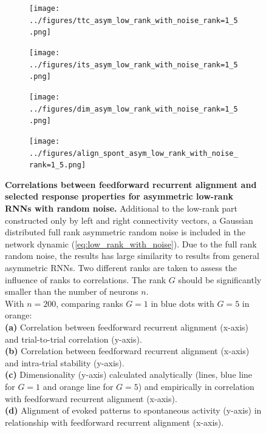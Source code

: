\documentclass[11pt]{article}
\begin{document}
		\begin{figure}[H]
			\centering
			\begin{subfigure}[b]{0.45\textwidth}
				\centering
				\texttt{[image: ../figures/ttc\_asym\_low\_rank\_with\_noise\_rank=1\_5.png]}
				\caption{}
			\end{subfigure}
			\hfill
			\begin{subfigure}[b]{0.45\textwidth}
				\centering
				\texttt{[image: ../figures/its\_asym\_low\_rank\_with\_noise\_rank=1\_5.png]}
				\caption{}
			\end{subfigure}
			\newline
			\begin{subfigure}[b]{0.45\textwidth}
				\centering
				\texttt{[image: ../figures/dim\_asym\_low\_rank\_with\_noise\_rank=1\_5.png]}
				\caption{}
			\end{subfigure}
			\hfill
			\begin{subfigure}[b]{0.45\textwidth}
				\centering
				\texttt{[image: ../figures/align\_spont\_asym\_low\_rank\_with\_noise\_rank=1\_5.png]}
				\caption{}
			\end{subfigure}
		\caption{\textbf{Correlations between feedforward recurrent alignment and selected response properties for asymmetric low-rank RNNs with random noise.} Additional to the low-rank part constructed only by left and right connectivity vectors, a Gaussian distributed full rank asymmetric random noise is included in the network dynamic (\ref{eq:low_rank_with_noise}). Due to the full rank random noise, the results has large similarity to results from general asymmetric RNNs. Two different ranks are taken to assess the influence of ranks to correlations. The rank $G$ should be significantly smaller than the number of neurons $n$. \\
		With $n = 200$, comparing ranks $G = 1$ in blue dots with $G=5$ in orange:\\
		\textbf{(a)} Correlation between feedforward recurrent alignment (x-axis) and trial-to-trial correlation (y-axis). \\
		\textbf{(b)} Correlation between feedforward recurrent alignment (x-axis) and intra-trial stability (y-axis). \\
		\textbf{(c)} Dimensionality (y-axis) calculated analytically (lines, blue line for $G=1$ and orange line for $G=5$) and empirically in correlation with feedforward recurrent alignment (x-axis).\\
		\textbf{(d)} Alignment of evoked patterns to spontaneous activity (y-axis) in relationship with feedforward recurrent alignment (x-axis).}
		\label{fig:result_asym_low_rank_with_noise}
		\end{figure}
 
\end{document}
